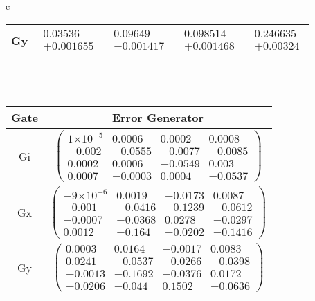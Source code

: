 \documentclass{beamer}
\providecommand{\e}[1]{\ensuremath{\times 10^{#1}}}
\begin{document}
\begin{frame}
\begin{table}[h]
\begin{center}
{\begin{tabular}{c}
\begin{tabular}[l]{|c|c|c|c|c|}
Gy & $ \begin{array}{c} 0.03536 \\ \pm 0.001655 \end{array} $ & $ \begin{array}{c} 0.09649 \\ \pm 0.001417 \end{array} $ & $ \begin{array}{c} 0.098514 \\ \pm 0.001468 \end{array} $ & $ \begin{array}{c} 0.246635 \\ \pm 0.00324 \end{array} $ \\ \hline
\end{tabular}

\\
\vspace{2em}
\\
\begin{tabular}[l]{|c|c|}
\hline
Gate & Error Generator \\ \hline
Gi & $ \left(\!\!\begin{array}{cccc}
1\e{-5} & 0.0006 & 0.0002 & 0.0008 \\ 
-0.002 & -0.0555 & -0.0077 & -0.0085 \\ 
0.0002 & 0.0006 & -0.0549 & 0.003 \\ 
0.0007 & -0.0003 & 0.0004 & -0.0537
 \end{array}\!\!\right) $
 \\ \hline
Gx & $ \left(\!\!\begin{array}{cccc}
-9\e{-6} & 0.0019 & -0.0173 & 0.0087 \\ 
-0.001 & -0.0416 & -0.1239 & -0.0612 \\ 
-0.0007 & -0.0368 & 0.0278 & -0.0297 \\ 
0.0012 & -0.164 & -0.0202 & -0.1416
 \end{array}\!\!\right) $
 \\ \hline
Gy & $ \left(\!\!\begin{array}{cccc}
0.0003 & 0.0164 & -0.0017 & 0.0083 \\ 
0.0241 & -0.0537 & -0.0266 & -0.0398 \\ 
-0.0013 & -0.1692 & -0.0376 & 0.0172 \\ 
-0.0206 & -0.044 & 0.1502 & -0.0636
 \end{array}\!\!\right) $
 \\ \hline
\end{tabular}

\end{tabular}
}
\end{center}
\end{table}

\end{frame}
\end{document}
